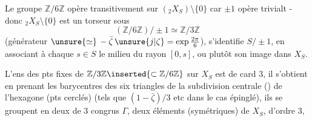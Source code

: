 
Le groupe $\mathbb Z/6\mathbb Z$ opère transitivement sur $({}_2X_S)\setminus\{0\}$ \unsure{(}car $\pm1$ opère trivialt - donc \({}_2X_S\setminus\{0\}\) est un torseur sous
\[
(\mathbb Z/6\mathbb Z)/\pm1\simeq\mathbb Z/3\mathbb Z
\]
 (générateur  $\unsure{\simeq}\,-\bar\zeta\,\unsure{j|\zeta}=\exp\frac{2\pi}{6}$),
  s'identifie  $S/\pm1$, en associant à chaque $s\in S$ le milieu du rayon $[0,s]$, ou plutôt son image \inserted{)} dans $X_S$.

L'ens des pts fixes de $\mathbb Z/3\mathbb Z\inserted{\subset\mathbb Z/6\mathbb Z}$ sur $X_S$ est de card 3, il s'obtient en prenant les barycentres des six triangles de la subdivision centrale () de l'hexagone (pts cerclés) (tels que $(1-\bar\zeta)/3$ etc dans le cas épinglé), ils se groupent en deux  de 3  congrus  $\Gamma$,  deux éléments (symétriques) de $X_S$, d'ordre 3,

